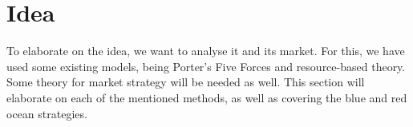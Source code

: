 \section{Idea}
\label{sec:idea}
To elaborate on the idea, we want to analyse it and its market. For this, we have used some existing models, being Porter's Five Forces and resource-based theory. Some theory for market strategy will be needed as well. This section will elaborate on each of the mentioned methods, as well as covering the blue and red ocean strategies.



